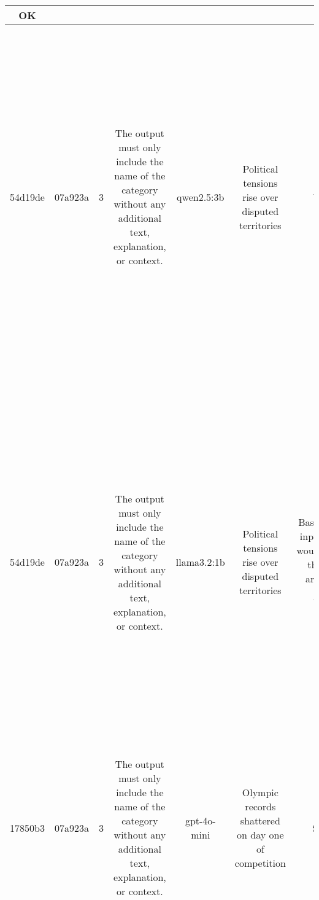 \begin{table}[h!]
\begin{tabular}{|c|c|c|c|c|c|c|c|c|c|}
OK & \\
\hline
54d19de & 07a923a & 3 & The output must only include the name of the category without any additional text, explanation, or context. & qwen2.5:3b & Political tensions rise over disputed territories & World & ok & No violation. The chatbot output provides a category "World," which is one of the categories specified in the description (World, Sports, Business, Sci/Tech). Therefore, it complies with the specified categories for classification.

OK & \\
\hline
54d19de & 07a923a & 3 & The output must only include the name of the category without any additional text, explanation, or context. & llama3.2:1b & Political tensions rise over disputed territories & Based on the input text, I would classify the news article as:

World & ok & No violation. The chatbot output complies with the description by providing a classification of the input text into one of the specified categories: World, Sports, Business, or Sci/Tech. In this case, the classification is "World," which is one of the valid categories.

OK & \\
\hline
17850b3 & 07a923a & 3 & The output must only include the name of the category without any additional text, explanation, or context. & gpt-4o-mini & Olympic records shattered on day one of competition & Sports & ok & No violation.
OK & \\
\hline
17850b3 & 07a923a & 3 & The output must only include the name of the category without any additional text, explanation, or context. & gemma2:9b & Olympic records shattered on day one of competition & **Sports** 


The phrase "Olympic records shattered" clearly indicates a story related & ok & The output "Sports" consists of just the category name without any accompanying explanation. Based on the given description, the output should classify the news article into one of the specified categories: World, Sports, Business, or Sci/Tech. The output correctly provides the category as "Sports," which is consistent with the description as the output only needs to classify the article into one of the specified categories. Since there is no requirement in the description for an explanation or reasoning behind the classification, the output complies with the description provided.

No violation.
OK & \\
\hline
17850b3 & 07a923a & 3 & The output must only include the name of the category without any additional text, explanation, or context. & qwen2.5:3b & Olympic records shattered on day one of competition & **Category:** Sports


\end{tabular}
\end{table}

